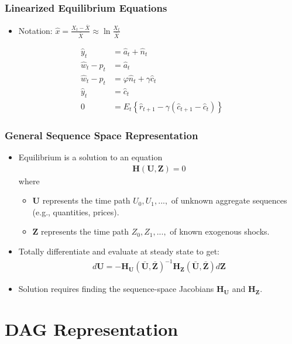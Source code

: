 \documentclass[english,xcolor=svgnames]{beamer}
\begin{document}
\begin{frame}
\frametitle{Linearized Equilibrium Equations}
\begin{itemize}
	\item Notation: $\hat{x} = \frac{X_t-\bar{X}}{\bar{X}}\approx \ln\frac{X_t}{\bar{X}}$
\end{itemize}
\begin{align*}
	\hat{y}_t&=\hat{a}_t + \hat{n}_{t}  \\
	\hat{w}_t - \hat{p}_t &= \hat{a}_t  \\
	\hat{w}_t - \hat{p}_t &=\varphi \hat{n}_t + \gamma \hat{c}_t \\
	\hat{y}_t&=\hat{c}_t \\
	0&= E_t\left\{\hat{r}_{t+1} -  \gamma (\hat{c}_{t+1} - \hat{c}_{t})\right\} 
\end{align*}
\end{frame}

\begin{frame}
    \frametitle{General Sequence Space Representation}
    \begin{itemize}
        \item Equilibrium is a solution to an equation
        \begin{align*}
        	\mathbf{H}(\mathbf{U}, \mathbf{Z}) = 0
        \end{align*}
        where
        \begin{itemize}
        	\item $\mathbf{U}$ represents the time path $U_0,U_1,...,$ of unknown aggregate sequences (e.g., quantities, prices).
        	\item $\mathbf{Z}$ represents the time path $Z_0,Z_1,...,$ of known exogenous shocks.
        \end{itemize}
        \item Totally differentiate and evaluate at steady state to get:
        \begin{align*}
        	d\mathbf{U} = -\mathbf{H}_{\mathbf{U}}(\mathbf{\bar{U}}, \mathbf{\bar{Z}})^{-1}\mathbf{H}_{\mathbf{Z}}(\mathbf{\bar{U}}, \mathbf{\bar{Z}})d\mathbf{Z}
        \end{align*}
        \item Solution requires finding the sequence-space Jacobians $\mathbf{H}_{\mathbf{U}}$ and $\mathbf{H}_{\mathbf{Z}}$.
	\end{itemize}
\end{frame}

\section{DAG Representation}
\end{document}
